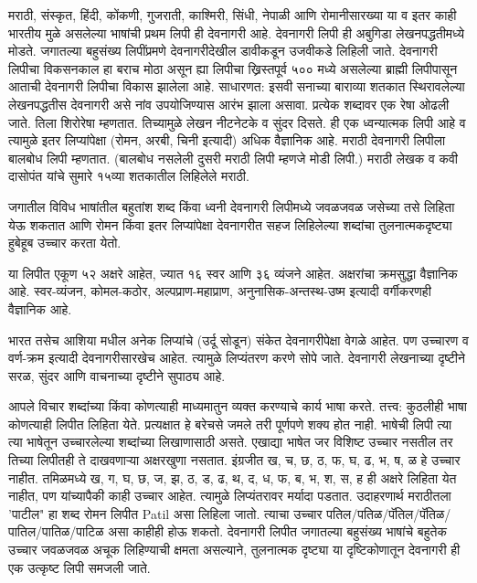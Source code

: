 \documentclass[a4paper,12pt,oneside,final]{article}
\begin{document}
मराठी, संस्कृत, हिंदी, कोंकणी, गुजराती, काश्मिरी, सिंधी, नेपाळी आणि रोमानीसारख्या या व इतर काही भारतीय मुळे असलेल्या भाषांची प्रथम लिपी ही देवनागरी आहे. देवनागरी लिपी ही अबुगिडा लेखनपद्धतीमध्ये मोडते. जगातल्या बहुसंख्य लिपींप्रमणे देवनागरीदेखील डावीकडून उजवीकडे लिहिली जाते. देवनागरी लिपीचा विकसनकाल हा बराच मोठा असून ह्या लिपीचा ख्रिस्तपूर्व ५०० मध्ये असलेल्या ब्राह्मी लिपीपासून आताची देवनागरी लिपीचा विकास झालेला आहे. साधारणत: इसवी सनाच्या बाराव्या शतकात स्थिरावलेल्या लेखनपद्धतीस देवनागरी असे नांव उपयोजिण्यास आरंभ झाला असावा. प्रत्येक शब्दावर एक रेषा ओढली जाते. तिला शिरोरेषा म्हणतात. तिच्यामुळे लेखन नीटनेटके व सुंदर दिसते. ही एक ध्वन्यात्मक लिपी आहे व त्यामुळे इतर लिप्यांपेक्षा (रोमन, अरबी, चिनी इत्यादी) अधिक वैज्ञानिक आहे. मराठी देवनागरी लिपीला बालबोध लिपी म्हणतात. (बालबोध नसलेली दुसरी मराठी लिपी म्हणजे मोडी लिपी.)
मराठी लेखक व कवी दासोपंत यांचे सुमारे १५व्या शतकातील लिहिलेले मराठी.

जगातील विविध भाषांतील बहुतांश शब्द किंवा ध्वनी देवनागरी लिपीमध्ये जवळजवळ जसेच्या तसे लिहिता येऊ शकतात आणि रोमन किंवा इतर लिप्यांपेक्षा देवनागरीत सहज लिहिलेल्या शब्दांचा तुलनात्मकदृष्ट्या हुबेहूब उच्चार करता येतो.

या लिपीत एकूण ५२ अक्षरे आहेत, ज्यात १६ स्वर आणि ३६ व्यंजने आहेत. अक्षरांचा क्रमसुद्धा वैज्ञानिक आहे. स्वर-व्यंजन, कोमल-कठोर, अल्पप्राण-महाप्राण, अनुनासिक-अन्तस्थ-उष्म इत्यादी वर्गीकरणही वैज्ञानिक आहे.

भारत तसेच आशिया मधील अनेक लिप्यांचे (उर्दू सोडून) संकेत देवनागरीपेक्षा वेगळे आहेत. पण उच्चारण व वर्ण-क्रम इत्यादी देवनागरीसारखेच आहेत. त्यामुळे लिप्यंतरण करणे सोपे जाते. देवनागरी लेखनाच्या दृष्टीने सरळ, सुंदर आणि वाचनाच्या दृष्टीने सुपाठ्य आहे.

आपले विचार शब्दांच्या किंवा कोणत्याही माध्यमातुन व्यक्त करण्याचे कार्य भाषा करते. तत्त्व: कुठलीही भाषा कोणत्याही लिपीत लिहिता येते. प्रत्यक्षात हे बरेचसे जमले तरी पूर्णपणे शक्य होत नाही. भाषेची लिपी त्या त्या भाषेतून उच्चारलेल्या शब्दांच्या लिखाणासाठी असते. एखाद्या भाषेत जर विशिष्ट उच्चार नसतील तर तिच्या लिपीतही ते दाखवणाऱ्या अक्षरखुणा नसतात. इंग्रजीत ख, च, छ, ठ, फ, घ, ढ, भ, ष, ळ हे उच्चार नाहीत. तमिळमध्ये ख, ग, घ, छ, ज, झ, ठ, ड, ढ, थ, द, ध, फ, ब, भ, श, स, ह ही अक्षरे लिहिता येत नाहीत, पण यांच्यापैकी काही उच्चार आहेत. त्यामुळे लिप्यंतरावर मर्यादा पडतात. उदाहरणार्थ मराठीतला 'पाटील" हा शब्द रोमन लिपीत Patil असा लिहिला जातो. त्याचा उच्चार पतिल/पतिळ/पॅतिल/पॅतिळ/पातिल/पातिळ/पाटिळ असा काहीही होऊ शकतो. देवनागरी लिपीत जगातल्या बहुसंख्य भाषांचे बहुतेक उच्चार जवळजवळ अचूक लिहिण्याची क्षमता असल्याने, तुलनात्मक दृष्ट्या या दृष्टिकोणातून देवनागरी ही एक उत्कृष्ट लिपी समजली जाते.
\end{document}

